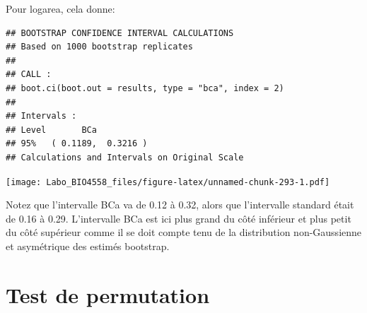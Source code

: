 \documentclass[12pt,]{book}
\newenvironment{Shaded}{\begin{snugshade}}{\end{snugshade}}
\newcommand{\CommentTok}[1]{\textcolor[rgb]{0.56,0.35,0.01}{\textit{#1}}}
\newcommand{\DataTypeTok}[1]{\textcolor[rgb]{0.13,0.29,0.53}{#1}}
\newcommand{\DecValTok}[1]{\textcolor[rgb]{0.00,0.00,0.81}{#1}}
\newcommand{\KeywordTok}[1]{\textcolor[rgb]{0.13,0.29,0.53}{\textbf{#1}}}
\newcommand{\NormalTok}[1]{#1}
\newcommand{\StringTok}[1]{\textcolor[rgb]{0.31,0.60,0.02}{#1}}
\begin{document}
\begin{Shaded}
\end{Shaded}

Pour logarea, cela donne:

\begin{verbatim}
## BOOTSTRAP CONFIDENCE INTERVAL CALCULATIONS
## Based on 1000 bootstrap replicates
## 
## CALL : 
## boot.ci(boot.out = results, type = "bca", index = 2)
## 
## Intervals : 
## Level       BCa          
## 95%   ( 0.1189,  0.3216 )  
## Calculations and Intervals on Original Scale
\end{verbatim}

\texttt{[image: Labo\_BIO4558\_files/figure-latex/unnamed-chunk-293-1.pdf]}

Notez que l'intervalle BCa va de 0.12 à 0.32, alors que l'intervalle standard était de 0.16 à 0.29. L'intervalle BCa est ici plus grand du côté inférieur et plus petit du côté supérieur comme il se doit compte tenu de la distribution non-Gaussienne et asymétrique des estimés bootstrap.

\hypertarget{perm_reg_mult}{%
\section{Test de permutation}\label{perm_reg_mult}}
\end{document}

